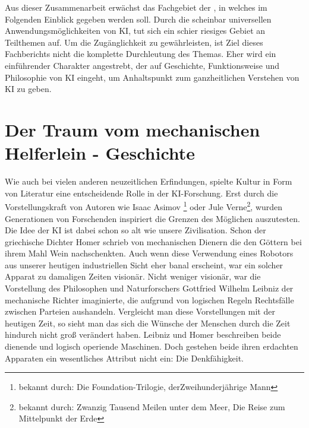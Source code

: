 \documentclass[12pt,german,ngerman]{report}
\begin{document}
    Aus dieser Zusammenarbeit erwächst das Fachgebiet der , in welches
    im Folgenden Einblick gegeben werden soll.
    Durch die scheinbar universellen Anwendungsmöglichkeiten von KI, tut sich ein schier riesiges Gebiet an Teilthemen auf.
    Um die Zugänglichkeit zu gewährleisten, ist Ziel dieses Fachberichts nicht die komplette Durchleutung
    des Themas. Eher wird ein einführender Charakter angestrebt,
    der auf Geschichte, Funktionsweise und Philosophie von KI eingeht,
    um Anhaltspunkt zum ganzheitlichen Verstehen von KI zu geben.
    

\chapter{Der Traum vom mechanischen Helferlein - Geschichte}

    Wie auch bei vielen anderen neuzeitlichen Erfindungen, spielte Kultur in Form von Literatur eine entscheidende Rolle
    in der KI-Forschung. Erst durch die Vorstellungskraft von Autoren wie Isaac Asimov
    \footnote{bekannt durch: Die Foundation-Trilogie, derZweihunderjährige Mann}
    oder Jule Verne\footnote{bekannt durch: Zwanzig Tausend Meilen unter dem Meer, Die Reise zum Mittelpunkt der Erde}, 
    wurden Generationen von Forschenden inspiriert die Grenzen des Möglichen auszutesten. 
    Die Idee der KI ist dabei schon so alt wie unsere Zivilisation. 
    Schon der griechische Dichter Homer schrieb von mechanischen Dienern die den Göttern bei ihrem Mahl
    Wein nachschenkten\cite[53]{buchanan2005very}. Auch wenn diese Verwendung eines Robotors aus unserer heutigen
    industriellen Sicht eher banal erscheint, war ein solcher Apparat zu damaligen Zeiten visionär.
    Nicht weniger visionär, war die Vorstellung des Philosophen und Naturforschers Gottfried Wilhelm Leibniz der mechanische
    Richter imaginierte, die aufgrund von logischen Regeln Rechtsfälle zwischen Parteien aushandeln\cite[53]{buchanan2005very}.
    Vergleicht man diese Vorstellungen mit der heutigen Zeit, so sieht man das sich die Wünsche der Menschen durch die Zeit hindurch
    nicht groß verändert haben. Leibniz und Homer beschreiben beide dienende und logisch operiende Maschinen.
    Doch gestehen beide ihren erdachten Apparaten ein wesentliches Attribut nicht ein: Die Denkfähigkeit. 
\end{document}
